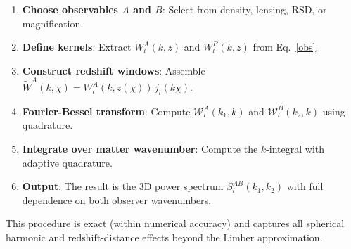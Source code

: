 \begin{enumerate}
  \item \textbf{Choose observables $A$ and $B$}: Select from density, lensing, RSD, or magnification.
  \item \textbf{Define kernels}: Extract $W_l^A(k, z)$ and $W_l^B(k, z)$ from Eq.~\ref{obs}.
  \item \textbf{Construct redshift windows}: Assemble $\widetilde{W}^A(k, \chi) = W_l^A(k, z(\chi)) \, j_l(k \chi)$.
  \item \textbf{Fourier-Bessel transform}: Compute $\mathcal{W}_l^A(k_1, k)$ and $\mathcal{W}_l^B(k_2, k)$ using quadrature.
  \item \textbf{Integrate over matter wavenumber}: Compute the $k$-integral with adaptive quadrature.
  \item \textbf{Output}: The result is the 3D power spectrum $S_l^{AB}(k_1, k_2)$ with full dependence on both observer wavenumbers.
\end{enumerate}

This procedure is exact (within numerical accuracy) and captures all spherical harmonic and redshift-distance effects beyond the Limber approximation.
